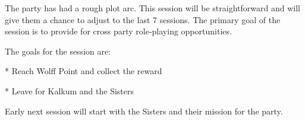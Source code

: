 The party has had a rough plot arc.
This session will be straightforward and will give them a chance to adjust to the last 7 sessions.
The primary goal of the session is to provide for cross party role-playing opportunities.

The goals for the session are:

* Reach Wolff Point and collect the reward

* Leave for Kalkum and the Sisters

Early next session will start with the Sisters and their mission for the party.
